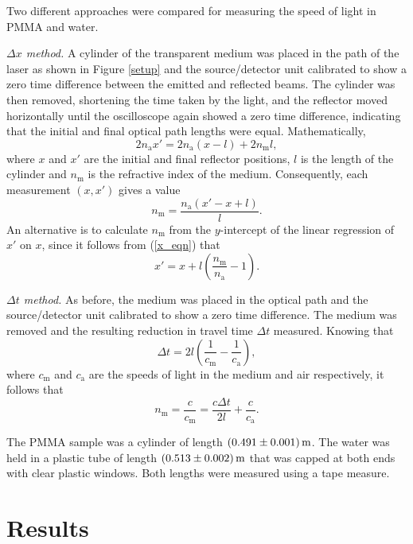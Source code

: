 \documentclass[
    aps,
    prl,
    reprint,
    10pt,
    amsmath,
    amssymb,
    a4paper,
    longbibliography
]{revtex4-2}
\begin{document}
Two different approaches were compared for measuring the speed of
light in PMMA and water.

\emph{$\Delta x$ method.} A cylinder of the transparent medium was placed
in the path of the laser as shown in Figure \ref{setup} and the
source/detector unit calibrated to show a zero time difference between
the emitted and reflected beams. The cylinder was then removed,
shortening the time taken by the light, and the reflector moved horizontally
until the oscilloscope again showed a zero time difference, indicating
that the initial and final optical path lengths were equal. Mathematically,
\[
    2 n_\mathrm{a} x' = 2 n_\mathrm{a} (x - l) + 2 n_\mathrm{m} l,
\]
where $x$ and $x'$ are the initial and final reflector positions, $l$ is
the length of the cylinder and $n_\mathrm{m}$ is the refractive index of the
medium. Consequently, each measurement $(x,x')$ gives a value
\begin{equation}
    n_\mathrm{m} = \frac{n_\mathrm{a} (x' - x + l)}{l}.
    \label{x_eqn}
\end{equation}
An alternative is to calculate $n_\mathrm{m}$ from the $y$-intercept of
the linear regression of $x'$ on $x$, since it follows from
(\ref{x_eqn}) that
\begin{equation}
    x' = x + l \left( \frac{n_\mathrm{m}}{n_\mathrm{a}} - 1 \right).
    \label{x_int_eqn}
\end{equation}

\emph{$\Delta t$ method.} As before, the medium was placed in the optical
path and the source/detector unit calibrated to show a zero time
difference. The medium was removed and the resulting reduction in
travel time $\Delta t$ measured. Knowing that
\[
    \Delta t = 2 l \left(
        \frac{1}{c_\mathrm{m}} - \frac{1}{c_\mathrm{a}}
    \right),
\]
where $c_\mathrm{m}$ and $c_\mathrm{a}$ are the speeds of light in the
medium and air respectively, it follows that
\begin{equation}
    n_\mathrm{m} = \frac{c}{c_\mathrm{m}}
    = \frac{c \Delta t}{2 l} + \frac{c}{c_\mathrm{a}}.
    \label{t_eqn}
\end{equation}

The PMMA sample was a cylinder of length $\SI{0.491 \pm 0.001}{\meter}$.
The water was held in a plastic tube of length
$\SI{0.513 \pm 0.002}{\meter}$ that was capped at both ends with clear
plastic windows. Both lengths were measured using a tape measure.


\section{Results}
\end{document}
